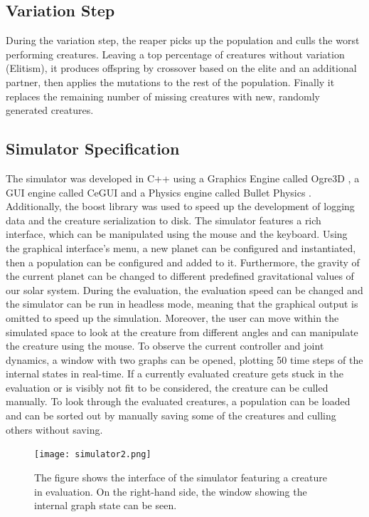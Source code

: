 \documentclass[main]{subfiles}
\begin{document}
\subsection{Variation Step}

During the variation step, the reaper picks up the population and culls the worst performing creatures. %
%
Leaving a top percentage of creatures without variation (Elitism), it produces offspring by crossover based on the elite and an additional partner, then applies the mutations to the rest of the population. %
%
Finally it replaces the remaining number of missing creatures with new, randomly generated creatures.

\subsection{Simulator Specification}

The simulator was developed in C++ using a Graphics Engine called Ogre3D \cite{bib:Ogre3D}, a GUI engine called CeGUI \cite{bib:CEGUI} and a Physics engine called Bullet Physics \cite{bib:BulletPhysics2015}. %
%
Additionally, the boost library \cite{bib:Boost} was used to speed up the development of logging data and the creature serialization to disk. %
%
The simulator features a rich interface, which can be manipulated using the mouse and the keyboard. Using the graphical interface's menu, a new planet can be configured and instantiated, then a population can be configured and added to it. %
%
Furthermore, the gravity of the current planet can be changed to different predefined gravitational values of our solar system. %
%
During the evaluation, the evaluation speed can be changed and the simulator can be run in headless mode, meaning that the graphical output is omitted to speed up the simulation. %
%
Moreover, the user can move within the simulated space to look at the creature from different angles and can manipulate the creature using the mouse. %
%
To observe the current controller and joint dynamics, a window with two graphs can be opened, plotting 50 time steps of the internal states in real-time. %
%
If a currently evaluated creature gets stuck in the evaluation or is visibly not fit to be considered, the creature can be culled manually. %
%
To look through the evaluated creatures, a population can be loaded and can be sorted out by manually saving some of the creatures and culling others without saving. %

\begin{figure}[H]
\centering
\texttt{[image: simulator2.png]}
\caption[The simulator interface]{The figure shows the interface of the simulator featuring a creature in evaluation. On the right-hand side, the window showing the internal graph state can be seen.}
\label{figure:simulator}
\end{figure}
\end{document}
